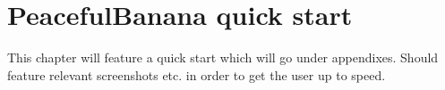 \chapter*{PeacefulBanana quick start}
This chapter will feature a quick start which will go under appendixes. 
Should feature relevant screenshots etc. in order to get the user up to speed. 